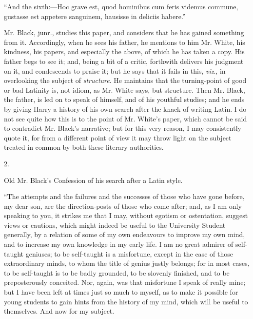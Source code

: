 ``And the sixth:—Hoc grave est, quod hominibus cum feris
videmus commune, gustasse est appetere sanguinem, hausisse in deliciis
habere.''

Mr. Black, junr., studies this paper, and considers that he has
gained something from it. Accordingly, when he sees his father, he
mentions to him Mr. White, his kindness, his papers, and
especially the above, of which he has taken a copy. His father begs to
see it; and, being a bit of a critic, forthwith delivers his judgment
on it, and condescends to praise it; but he says that it fails in
this, \emph{viz}., in overlooking the subject of \emph{structure}. He
maintains that the turning-point of good or bad Latinity is, not
idiom, as Mr. White says, but structure. Then Mr. Black, the father,
is led on to speak of himself, and of his youthful studies; and he
ends by giving Harry a history of his own search after the knack of
writing Latin. I do not see quite how this is to the point of Mr.
White's paper, which cannot be said to contradict Mr. Black's
narrative; but for this very reason, I may consistently quote it, for
from a different point of view it may throw light on the subject
treated in common by both these literary authorities.

2.

Old Mr. Black's Confession of his search after a
Latin
style.

``The attempts and the failures and the successes of those who
have gone before, my dear son, are the direction-posts of those who
come after; and, as I am only speaking to you, it strikes me that I
may, without egotism or ostentation, suggest views or cautions, which
might indeed be useful to the University Student generally, by a
relation of some of my own endeavours to improve my own mind, and to
increase my own knowledge in my early life. I am no great admirer of
self-taught geniuses; to be self-taught is a misfortune, except in the
case of those extraordinary minds, to whom the title of genius justly
belongs; for in most cases, to be self-taught is to be badly grounded,
to be slovenly finished, and to be preposterously conceited.
Nor, again, was that misfortune I speak of really mine; but I have
been left at times just so much to myself, as to make it possible for
young students to gain hints from the history of my mind, which will
be useful to themselves. And now for my subject.

